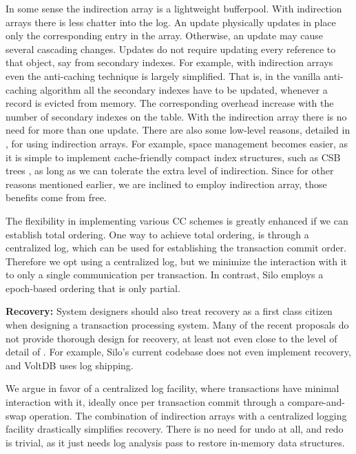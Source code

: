 In some sense the indirection array is a lightweight bufferpool. With indirection arrays there is less chatter into the log. An update physically updates in place only the corresponding entry in the array. Otherwise, an update may cause several cascading changes. 
Updates do not require updating every reference to that object, say from secondary indexes. 
For example, with indirection arrays even the anti-caching technique \cite{DeBrabantPTSZ13} is largely simplified. That is, in the vanilla anti-caching algorithm all the secondary indexes have to be updated, whenever a record is evicted from memory. The corresponding overhead increase with the number of secondary indexes on the table. With the indirection array there is no need for more than one update. 
There are also some low-level reasons, detailed in , for using indirection arrays. For example, space management becomes easier, as it is simple to implement cache-friendly compact index structures, such as CSB trees \cite{RaoR00}, as long as we can tolerate the extra level of indirection. Since for other reasons mentioned earlier, we are inclined to employ indirection array, those benefits come from free. 

The flexibility in implementing various CC schemes is greatly enhanced if we can establish total ordering. One way to achieve total ordering, is through a centralized log, which can be used for establishing the transaction commit order. Therefore we opt using a centralized log, but we minimize the interaction with it to only a single communication per transaction. 
In contrast, Silo employs a epoch-based ordering that is only partial. 

\vspace{2mm}
{\bf Recovery:} 
System designers should also treat recovery as a first class citizen when designing a transaction processing system. Many of the recent proposals do not provide thorough design for recovery, at least not even close to the level of detail of \cite{MohanHLPS92}.   For example, Silo's current codebase does not even implement recovery, and VoltDB uses log shipping. 

We argue in favor of a centralized log facility, where transactions have minimal interaction with it, ideally once per transaction commit through a compare-and-swap operation.  
The combination of indirection arrays with a centralized logging facility drastically simplifies recovery. There is no need for undo at all, and redo is trivial, as it just needs log analysis pass to restore in-memory data structures. 

